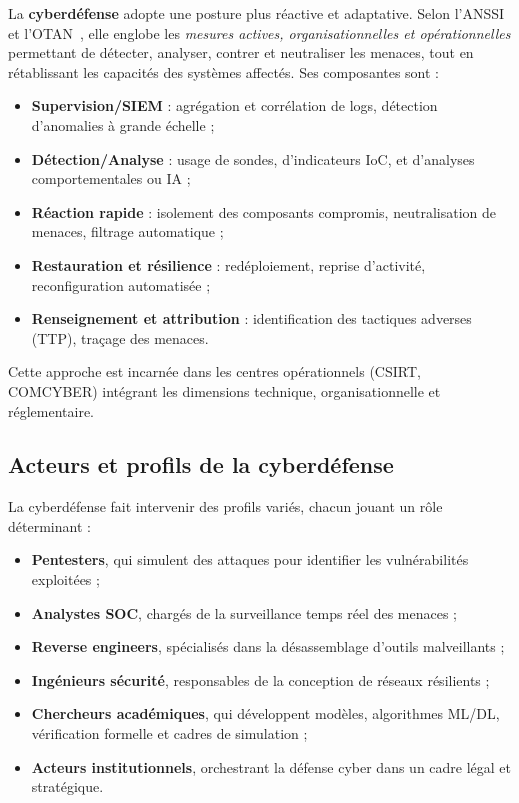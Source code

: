 \documentclass[ twoside,openright,titlepage,numbers=noenddot,headinclude,%
                footinclude=true,cleardoublepage=empty,abstractoff, %
                BCOR=5mm,paper=a4,fontsize=11pt,%
                french,american,%
                ]{scrreprt}
\begin{document}
La \textbf{cyberdéfense} adopte une posture plus réactive et adaptative. Selon l’ANSSI et l’OTAN~\cite{ANSSI2020,NATO2016Cyberdef}, elle englobe les \emph{mesures actives, organisationnelles et opérationnelles} permettant de détecter, analyser, contrer et neutraliser les menaces, tout en rétablissant les capacités des systèmes affectés. Ses composantes sont :
\begin{itemize}
  \item \textbf{Supervision/SIEM} : agrégation et corrélation de logs, détection d’anomalies à grande échelle ;
  \item \textbf{Détection/Analyse} : usage de sondes, d’indicateurs IoC, et d’analyses comportementales ou IA ;
  \item \textbf{Réaction rapide} : isolement des composants compromis, neutralisation de menaces, filtrage automatique ;
  \item \textbf{Restauration et résilience} : redéploiement, reprise d’activité, reconfiguration automatisée ;
  \item \textbf{Renseignement et attribution} : identification des tactiques adverses (TTP), traçage des menaces.
\end{itemize}
Cette approche est incarnée dans les centres opérationnels (CSIRT, COMCYBER) intégrant les dimensions technique, organisationnelle et réglementaire.

\subsection*{Acteurs et profils de la cyberdéfense}

La cyberdéfense fait intervenir des profils variés, chacun jouant un rôle déterminant :
\begin{itemize}
  \item \textbf{Pentesters}, qui simulent des attaques pour identifier les vulnérabilités exploitées ;
  \item \textbf{Analystes SOC}, chargés de la surveillance temps réel des menaces ;
  \item \textbf{Reverse engineers}, spécialisés dans la désassemblage d’outils malveillants ;
  \item \textbf{Ingénieurs sécurité}, responsables de la conception de réseaux résilients ;
  \item \textbf{Chercheurs académiques}, qui développent modèles, algorithmes ML/DL, vérification formelle et cadres de simulation ;
  \item \textbf{Acteurs institutionnels}, orchestrant la défense cyber dans un cadre légal et stratégique.
\end{itemize}
\end{document}
